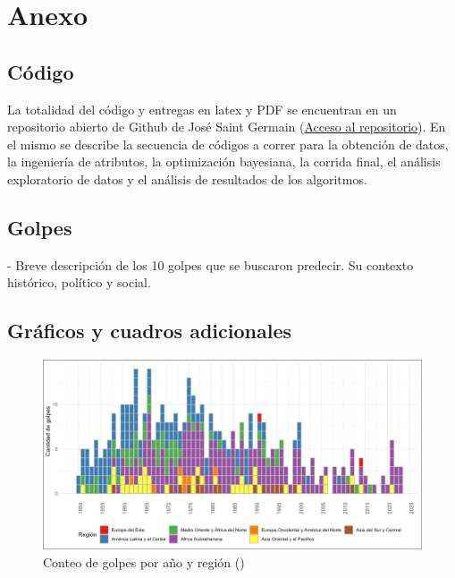\documentclass{article}
\begin{document}
\section{Anexo}
\subsection{Código}
La totalidad del código y entregas en latex y PDF se encuentran en un repositorio abierto de
Github de José Saint Germain (\href{https://github.com/josesg998/esp_data_mining}{Acceso al 
repositorio}). En el mismo se describe la secuencia de códigos a correr para la obtención de 
datos, la ingeniería de atributos, la optimización bayesiana, la corrida final, el análisis 
exploratorio de datos y el análisis de resultados de los algoritmos.

\subsection{Golpes}
- Breve descripción de los 10 golpes que se buscaron predecir. Su contexto histórico, político y 
social.
\subsection{Gráficos y cuadros adicionales}
\begin{figure}[H]
  \centering  
  \includegraphics[width=1\textwidth]{4_golpes_anios.png}
  \caption{Conteo de golpes por año y región (\cite{Pow11})\label{fig:golpes_anios}}
\end{figure}
\end{document}

